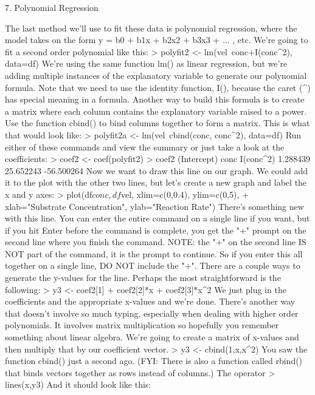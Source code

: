 7. Polynomial Regression


The last method we'll use to fit these data is polynomial regression, where the model takes on the form y = b0 + b1x + b2x2 + b3x3 + ... , etc. We're going to fit a second order polynomial like this: 
> polyfit2 <- lm(vel~conc+I(conc^2), data=df)
We're using the same function lm() as linear regression, but we're adding multiple instances of the explanatory variable to generate our polynomial formula. Note that we need to use the identity function, I(), because the caret (^) has special meaning in a formula. Another way to build this formula is to create a matrix where each column contains the explanatory variable raised to a power. Use the function cbind() to bind columns together to form a matrix. This is what that would look like: 
> polyfit2a <- lm(vel~cbind(conc, conc^2), data=df)
Run either of these commands and view the summary or just take a look at the coefficients: 
> coef2 <- coef(polyfit2)
> coef2
(Intercept)        conc   I(conc^2) 
   1.288439   25.652243  -56.500264 
Now we want to draw this line on our graph. We could add it to the plot with the other two lines, but let's create a new graph and label the x and y axes: 
> plot(df$conc, df$vel, xlim=c(0,0.4), ylim=c(0,5), 
+ xlab="Substrate Concentration", ylab="Reaction Rate")
There's something new with this line. You can enter the entire command on a single line if you want, but if you hit Enter before the command is complete, you get the "+" prompt on the second line where you finish the command. NOTE: the "+" on the second line IS NOT part of the command, it is the prompt to continue. So if you enter this all together on a single line, DO NOT include the "+". 
There are a couple ways to generate the y-values for the line. Perhaps the most straightforward is the following: 
> y3 <- coef2[1] + coef2[2]*x + coef2[3]*x^2
We just plug in the coefficients and the appropriate x-values and we're done. There's another way that doesn't involve so much typing, especially when dealing with higher order polynomials. It involves matrix multiplication so hopefully you remember something about linear algebra. We're going to create a matrix of x-values and then multiply that by our coefficient vector. 
> y3 <- cbind(1,x,x^2) %
You saw the function cbind() just a second ago. (FYI: There is also a function called rbind() that binds vectors together as rows instead of columns.) The operator %
> lines(x,y3)
And it should look like this: 

